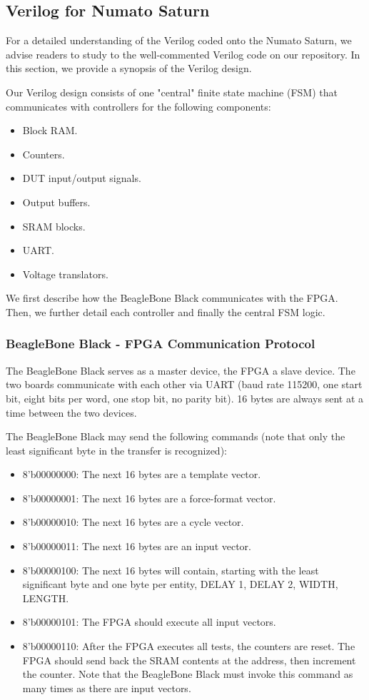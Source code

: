 \subsection{Verilog for Numato Saturn}
For a detailed understanding of the Verilog coded onto the Numato Saturn, we advise readers to study to the well-commented Verilog code on our repository. In this section, we provide a synopsis of the Verilog design.

Our Verilog design consists of one "central" finite state machine (FSM) that communicates with controllers for the following components: 
\begin{itemize}
	\item Block RAM.
	\item Counters.
	\item DUT input/output signals.
	\item Output buffers.
	\item SRAM blocks.
	\item UART.
	\item Voltage translators.
\end{itemize}

We first describe how the BeagleBone Black communicates with the FPGA. Then, we further detail each controller and finally the central FSM logic.

\subsubsection{BeagleBone Black - FPGA Communication Protocol}
The BeagleBone Black serves as a master device, the FPGA a slave device. The two boards communicate with each other via UART (baud rate 115200, one start bit, eight bits per word, one stop bit, no parity bit). 16 bytes are always sent at a time between the two devices.

The BeagleBone Black may send the following commands (note that only the least significant byte in the transfer is recognized): 
\begin{itemize}
\item 8'b00000000: The next 16 bytes are a template vector.
\item 8'b00000001: The next 16 bytes are a force-format vector.
\item 8'b00000010: The next 16 bytes are a cycle vector.
\item 8'b00000011: The next 16 bytes are an input vector.
\item 8'b00000100: The next 16 bytes will contain, starting with the least significant byte and one byte per entity, DELAY 1, DELAY 2, WIDTH, LENGTH.
\item 8'b00000101: The FPGA should execute all input vectors.
\item 8'b00000110: After the FPGA executes all tests, the counters are reset. The FPGA should send back the SRAM contents at the address, then increment the counter. Note that the BeagleBone Black must invoke this command as many times as there are input vectors.
\end{itemize}

